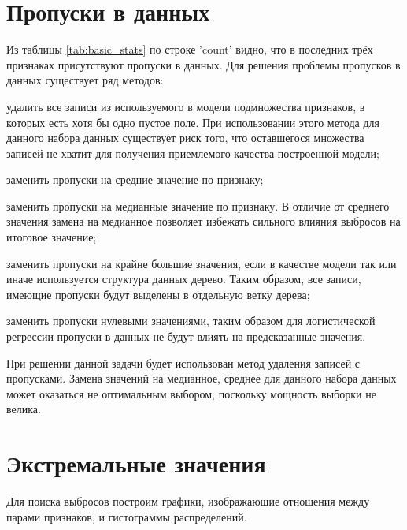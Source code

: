 \section{Пропуски в данных}

Из таблицы \ref{tab:basic_stats} по строке 'count' видно, что в последних трёх признаках присутствуют пропуски в данных. Для решения проблемы пропусков в данных существует ряд методов:

\begin{description}[font=$\bullet$]
    \item удалить все записи из используемого в модели подмножества признаков, в которых есть хотя бы одно пустое поле. При использовании этого метода для данного набора данных существует риск того, что оставшегося множества записей не хватит для получения приемлемого качества построенной модели;
    \item заменить пропуски на средние значение по признаку;
    \item заменить пропуски на медианные значение по признаку. В отличие от среднего значения замена на медианное позволяет избежать сильного влияния выбросов на итоговое значение;
    \item заменить пропуски на крайне большие значения, если в качестве модели так или иначе используется структура данных дерево. Таким образом, все записи, имеющие пропуски будут выделены в отдельную ветку дерева;
    \item заменить пропуски нулевыми значениями, таким образом для логистической регрессии пропуски в данных не будут влиять на предсказанные значения.
\end{description}
При решении данной задачи будет использован метод удаления записей с пропусками. Замена значений на медианное, среднее для данного набора данных может оказаться не оптимальным выбором, поскольку мощность выборки не велика.



\section{Экстремальные значения}

Для поиска выбросов построим графики, изображающие отношения между парами признаков, и гистограммы распределений.\\

